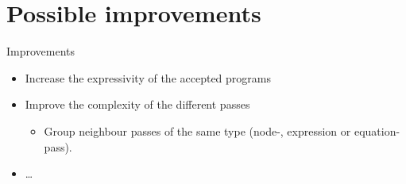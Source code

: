 \documentclass{beamer}
\begin{document}
\section{Possible improvements}
\begin{frame}{Improvements}
    \begin{itemize}
        \item Increase the expressivity of the accepted programs
        \item Improve the complexity of the different passes
        \begin{itemize}
            \item Group neighbour passes of the same type (node-, expression or
            equation-pass).
        \end{itemize}
        \item \dots{}
    \end{itemize}
\end{frame}
\end{document}
